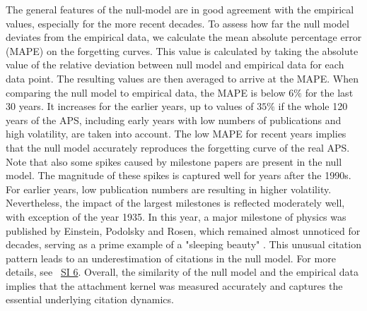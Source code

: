 \documentclass[fleqn,10pt]{wlscirep}
\begin{document}
The general features of the null-model are in good agreement with the empirical values, especially for the more recent decades. To assess how far the null model deviates from the empirical data, we calculate the mean absolute percentage error (MAPE) on the forgetting curves. This value is calculated by taking the absolute value of the relative deviation between null model and empirical data for each data point. The resulting values are then averaged to arrive at the MAPE. When comparing the null model to empirical data, the MAPE is below $6\%$ for the last 30 years. It increases for the earlier years, up to values of $35\%$ if the whole 120 years of the APS, including early years with low numbers of publications and high volatility, are taken into account. The low MAPE for recent years implies that the null model accurately reproduces the forgetting curve of the real APS. Note that also some spikes caused by milestone papers are present in the null model. The magnitude of these spikes is captured well for years after the 1990s. For earlier years, low publication numbers are resulting in higher volatility. Nevertheless, the impact of the largest milestones is reflected moderately well, with exception of the year 1935. In this year, a major milestone of physics was published by Einstein, Podolsky and Rosen, which remained almost unnoticed for decades, serving as a prime example of a "sleeping beauty" \cite{Ke2015}. This unusual citation pattern leads to an underestimation of citations in the null model. For more details, see ~\hyperref[SI6]{SI 6}. Overall, the similarity of the null model and the empirical data implies that the attachment kernel was measured accurately and  captures the essential underlying citation dynamics.
\end{document}

